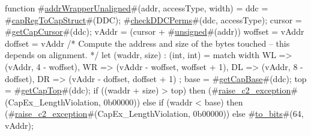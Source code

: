 function #\hyperref[zaddrWrapperUnaligned]{addrWrapperUnaligned}#(addr, accessType, width) =
  {
    ddc    = #\hyperref[zcapRegToCapStruct]{capRegToCapStruct}#(DDC);
    #\hyperref[zcheckDDCPerms]{checkDDCPerms}#(ddc, accessType);
    cursor = #\hyperref[zgetCapCursor]{getCapCursor}#(ddc);
    vAddr  = (cursor + #\hyperref[zunsigned]{unsigned}#(addr)) %
    woffset = vAddr %
    doffset = vAddr %
    /* Compute the address and size of the bytes touched -- this depends on alignment. */
    let (waddr, size) : (int, int) = match width {
      WL => (vAddr, 4 - woffset),
      WR => (vAddr - woffset, woffset + 1),
      DL => (vAddr, 8 - doffset),
      DR => (vAddr - doffset, doffset + 1)
    };
    base   = #\hyperref[zgetCapBase]{getCapBase}#(ddc);
    top    = #\hyperref[zgetCapTop]{getCapTop}#(ddc);
    if ((waddr + size) > top) then
      (#\hyperref[zraisezyctwozyexception]{raise\_c2\_exception}#(CapEx_LengthViolation, 0b00000))
    else if (waddr < base) then
      (#\hyperref[zraisezyctwozyexception]{raise\_c2\_exception}#(CapEx_LengthViolation, 0b00000))
    else
      #\hyperref[ztozybits]{to\_bits}#(64, vAddr);
  }
